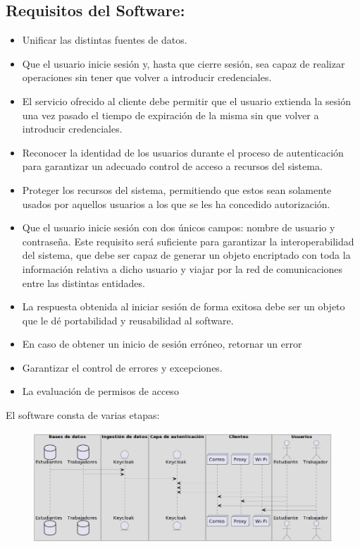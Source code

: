 \subsection*{Requisitos del Software:}
\begin{itemize}
	\item Unificar las distintas fuentes de datos.
	\item Que el usuario inicie sesión y, hasta que cierre sesión, sea capaz de realizar operaciones sin tener que volver a introducir credenciales. 
	\item El servicio ofrecido al cliente debe permitir que el usuario extienda la sesión una vez pasado el tiempo de expiración de la misma sin que volver a introducir credenciales. 
	\item Reconocer la identidad de los usuarios durante el proceso de autenticación para garantizar un adecuado control de acceso a recursos del sistema.
	\item Proteger los recursos del sistema, permitiendo que estos sean solamente usados por aquellos usuarios a los que se les ha concedido autorización.
	\item Que el usuario inicie sesión con dos únicos campos: nombre de usuario y contraseña. Este requisito será suficiente para garantizar la interoperabilidad del sistema, que debe ser capaz de generar un objeto encriptado con toda la información relativa a dicho usuario y viajar por la red de comunicaciones entre las distintas entidades. 
	\item  La respuesta obtenida al iniciar sesión de forma exitosa debe ser un objeto que le dé portabilidad y reusabilidad al software.
	\item En caso de obtener un inicio de sesión erróneo, retornar un error
	\item Garantizar el control de errores y excepciones.
	\item La evaluación de permisos de acceso
\end{itemize}

El software consta de varias etapas:

\begin{figure}[H]
	\centering
	\includegraphics[width=0.9\linewidth]{"Graphics/Diagrama Tesis"}
	\caption{}
	\label{fig:diagrama-tesis}
\end{figure}

